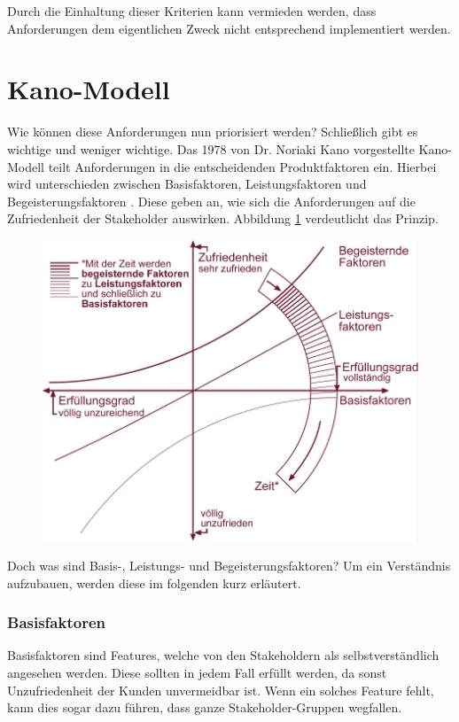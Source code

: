 Durch die Einhaltung dieser Kriterien kann vermieden werden, dass Anforderungen dem eigentlichen Zweck nicht entsprechend implementiert werden.


\section{Kano-Modell}
\label{sec:kano} 
Wie können diese Anforderungen nun priorisiert werden? Schließlich gibt es wichtige und weniger wichtige.
Das 1978 von Dr. Noriaki Kano vorgestellte Kano-Modell teilt Anforderungen in die entscheidenden Produktfaktoren ein. Hierbei wird unterschieden zwischen Basisfaktoren, Leistungsfaktoren und Begeisterungsfaktoren \citep{Rupp2}. Diese geben an, wie sich die Anforderungen auf die Zufriedenheit der Stakeholder auswirken. Abbildung \ref{fig:kano} verdeutlicht das Prinzip.

\begin{figure}[!htb]
		\includegraphics[width=.5\textwidth]{images/Kano-Modell.pdf}
\centering 
{} 
\label{fig:kano}
\end{figure}

Doch was sind Basis-, Leistungs- und Begeisterungsfaktoren? Um ein Verständnis aufzubauen, werden diese im folgenden kurz erläutert.

\subsubsection{Basisfaktoren}
Basisfaktoren sind Features, welche von den Stakeholdern als selbstverständlich angesehen werden. Diese sollten in jedem Fall erfüllt werden, da sonst Unzufriedenheit der Kunden unvermeidbar ist. Wenn ein solches Feature fehlt, kann dies sogar dazu führen, dass ganze Stakeholder-Gruppen wegfallen.

